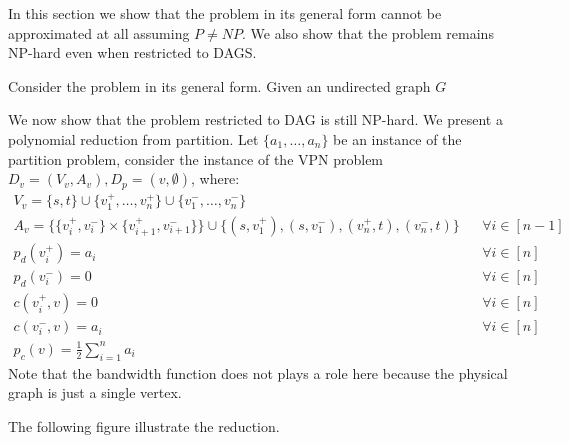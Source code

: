 In this section we show that the problem in its general form cannot be
approximated at all assuming $P \neq NP$.
We also show that the problem remains NP-hard even when restricted to DAGS.

Consider the problem in its general form. 
Given an undirected graph $G$

We now show that the problem restricted to DAG is still NP-hard.
We present a polynomial reduction from partition.
Let $\{a_1, \ldots, a_n\}$ be an instance of the partition problem, 
consider the instance of the VPN problem 
$D_v = (V_v, A_v), D_p = ({v}, \emptyset)$, 
where:
\begin{align}
V_v = \{s, t\} \cup \{v_1^+, \ldots, v_n^+\} \cup \{v_1^-, \ldots, v_n^-\}
\\
A_v = \{\{v_i^+, v_i^-\} \times \{v_{i + 1}^+, v_{i + 1}^-\}\} 
\cup \{(s, v_1^+), (s, v_1^-), (v_n^+, t), (v_n^-, t)\}
&&
\forall i \in [n-1]
\\
p_d(v_i^+) = a_i && \forall i \in [n]
\\
p_d(v_i^-) = 0 && \forall i \in [n]
\\
c(v_i^+, v) = 0 && \forall i \in [n]
\\
c(v_i^-, v) = a_i && \forall i \in [n] 
\\
p_c(v) = \frac{1}{2}\sum_{i = 1}^n a_i
\end{align}
Note that the bandwidth function does not plays a role here because the physical graph
is just a single vertex.

The following figure illustrate the reduction.
\begin{figure}[ht]
\centering

\end{figure}

